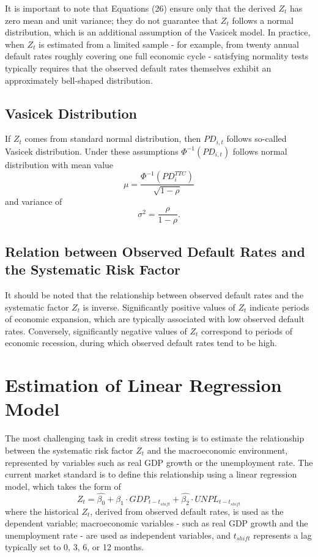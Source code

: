 \documentclass[11pt,a4paper]{article}
\begin{document}
It is important to note that Equations (26) ensure only that the derived $Z_t$ has zero mean and unit variance; they do not guarantee that 
$Z_t$ follows a normal distribution, which is an additional assumption of the Vasicek model. In practice, when $Z_t$ is estimated from a limited sample - for example, from twenty annual default rates roughly covering one full economic cycle - satisfying normality tests typically requires that the observed default rates themselves exhibit an approximately bell-shaped distribution.

\subsection{Vasicek Distribution}

If $Z_t$ comes from standard normal distribution, then $PD_{i, t}$ follows so-called Vasicek distribution. Under these assumptions $\Phi^{-1}(PD_{i, t})$ follows normal distribution with mean value
\begin{equation}
\mu = \frac{\Phi^{-1}(PD_i^{TTC})}{\sqrt{1 - \rho}}
\end{equation}  
and variance of
\begin{equation}
\sigma^2 = \frac{\rho}{1 - \rho}.
\end{equation}

\subsection{Relation between Observed Default Rates and the Systematic Risk Factor}

It should be noted that the relationship between observed default rates and the systematic factor $Z_t$ is inverse. Significantly positive values of $Z_t$ indicate periods of economic expansion, which are typically associated with low observed default rates. Conversely, significantly negative values of $Z_t$ correspond to periods of economic recession, during which observed default rates tend to be high.

\section{Estimation of Linear Regression Model}

The most challenging task in credit stress testing is to estimate the relationship between the systematic risk factor $Z_t$ and the macroeconomic environment, represented by variables such as real GDP growth or the unemployment rate. The current market standard is to define this relationship using a linear regression model, which takes the form of
\begin{equation}
Z_t = \widehat{\beta_0} + \widehat{\beta_1} \cdot GDP_{t - t_{shift}} + \widehat{\beta_2} \cdot UNPL_{t - t_{shift}}
\end{equation}
where the historical $Z_t$, derived from observed default rates, is used as the dependent variable; macroeconomic variables - such as real GDP growth and the unemployment rate - are used as independent variables, and $t_{shift}$ represents a lag typically set to 0, 3, 6, or 12 months.
\end{document}
